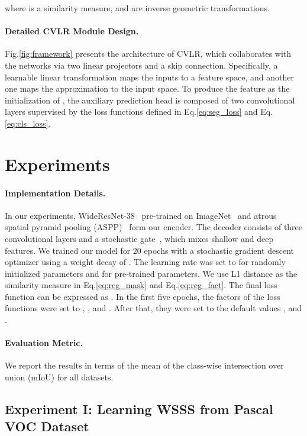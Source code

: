 \documentclass[twocolumn]{svjour3}          \smartqed  \usepackage{graphicx}
\makeatletter
\newcommand{\Eq}{Eq.\@\xspace}
\newcommand{\Fig}{Fig.\@\xspace}
\makeatother
\begin{document}
where  is a similarity measure,  and  are inverse geometric transformations.

\paragraph{Detailed CVLR Module Design.}
\Fig\ref{fig:framework} presents the architecture of CVLR, which collaborates with the networks via two linear projectors and a skip connection.
Specifically, a learnable linear transformation maps the inputs to a feature space, and another one maps the approximation  to the input space.
To produce the feature  as the initialization of , the auxiliary prediction head is composed of two convolutional layers supervised by the loss functions defined in \Eq\ref{eq:seg_loss} and \Eq\ref{eq:cls_loss}.




\section{Experiments}
\paragraph{Implementation Details.}
In our experiments, WideResNet-38~\citep{wu2019:WiderResNet} pre-trained on ImageNet~\citep{DengDSLL009:imagenet} and atrous spatial pyramid pooling (ASPP)~\citep{deeplabv3plus2018} form our encoder. The decoder consists of three convolutional layers and a stochastic gate~\citep{Araslanov020:SingleStage}, which mixes shallow and deep features.
We trained our model for 20 epochs with a stochastic gradient descent optimizer using a weight decay of .
The learning rate was set to  for randomly initialized parameters and  for pre-trained parameters. 
We use L1 distance as the similarity measure  in \Eq\ref{eq:reg_mask} and \Eq\ref{eq:reg_fact}.
The final loss function can be expressed as .
In the first five epochs, the factors of the loss functions were
set to  , , and . After that, they were set to the default values  ,  and .

\paragraph{Evaluation Metric.}
We report the results in terms of the mean of the class-wise intersection over union (mIoU) for all datasets.

\subsection{Experiment I: Learning WSSS from Pascal VOC Dataset}
\end{document}
